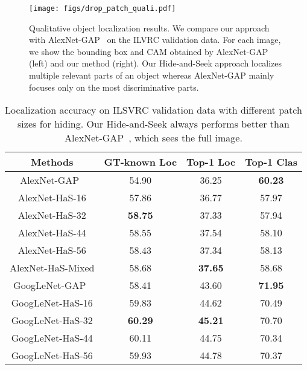 \begin{figure*}[t!]
\centering
    \texttt{[image: figs/drop\_patch\_quali.pdf]}
    \caption{Qualitative object localization results.  We compare our approach with AlexNet-GAP~\cite{zhou-cvpr2016} on the ILVRC validation data. For each image, we show the bounding box and CAM obtained by AlexNet-GAP (left) and our method (right).  Our Hide-and-Seek approach localizes multiple relevant parts of an object whereas AlexNet-GAP mainly focuses only on the most discriminative parts.}
    \vspace*{-0.12in}
\label{fig:qualresults}
\end{figure*}







\begin{table}[t!]
\begin{center}
    \footnotesize
    \begin{tabular}{| c | c | c| c|}
    	
    \hline    	
    Methods & GT-known Loc &  Top-1 Loc  & Top-1 Clas   \\
    \hline
    
    AlexNet-GAP~\cite{zhou-cvpr2016}  &  54.90\footnotemark[2] & 36.25 & \textbf{60.23}\\
    AlexNet-HaS-16     & 57.86 & 36.77 & 57.97  \\
    AlexNet-HaS-32            & \textbf{58.75} & 37.33 & 57.94 \\
    AlexNet-HaS-44            & 58.55 & 37.54 & 58.10 \\
    AlexNet-HaS-56            & 58.43 & 37.34 & 58.13  \\
    AlexNet-HaS-Mixed       & 58.68 & \textbf{37.65} & 58.68 \\
   

            \hline
     GoogLeNet-GAP~\cite{zhou-cvpr2016}  & 58.41\footnotemark[2] & 43.60 & \textbf{71.95}  \\
     GoogLeNet-HaS-16            & 59.83 & 44.62 & 70.49 \\
                GoogLeNet-HaS-32            &  \textbf{60.29} & \textbf{45.21} & 70.70 \\
                GoogLeNet-HaS-44          & 60.11 & 44.75 & 70.34  \\
                GoogLeNet-HaS-56            & 59.93 & 44.78 & 70.37  \\
                \hline

    \end{tabular}
    \caption{Localization accuracy on ILSVRC validation data with different patch sizes for hiding.  Our Hide-and-Seek always performs better than AlexNet-GAP~\cite{zhou-cvpr2016}, which sees the full image.}
    \label{table:patch_size_results}
\end{center}
\vspace*{-0.15in}
\end{table}

